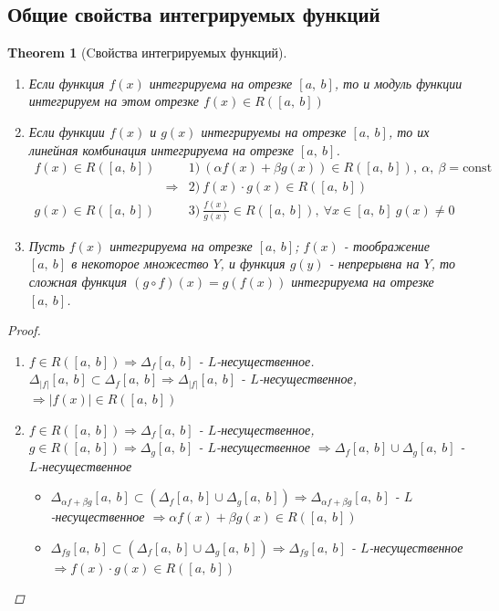 \documentclass[a4paper,12pt, centered]{bookest}
\newtheorem{theorem}{Theorem}[section]
\theoremstyle{remark}
\newcommand\const{\textrm{const}}
\begin{document}
\subsection{Общие свойства интегрируемых функций}
\begin{theorem}[Cвойства интегрируемых функций]$ $ 
	\begin{enumerate}
		\item Если функция $f(x)$ интегрируема на отрезке $[a,\>b]$, то и модуль функции интегрируем на этом отрезке $f(x)\in R([a,\>b])$
		\item Если функции $f(x)$ и $g(x)$   интегрируемы на отрезке $[a,\>b]$, то их линейная комбинация интегрируема на отрезке $[a,\>b]$.\\ $\begin{array}{ccl}
			f(x)\in R([a,\>b]) &&1)\>(\alpha f(x)+\beta g(x))\in R([a,\>b]),\>\alpha,\>\beta =\const\\
			&\Rightarrow&2)\>f(x)\cdot g(x)\in R([a,\>b])\\
			g(x)\in R([a,\>b])&&3)\>\frac{f(x)}{g(x)}\in  R([a,\>b]),\>\forall x\in[a,\>b]\>g(x)\ne0
		\end{array}$
		\item Пусть $f(x)$ интегрируема на отрезке $[a,\>b]$; $f(x)$ - тоображение $[a,\>b]$ в некоторое множество $Y$, и функция $g(y)$ - непрерывна на $Y$, то сложная функция $(g\circ f)(x)=g(f(x))$ интегрируема на отрезке $[a,\>b]$.
	\end{enumerate}
	\begin{proof}$ $ 
		\begin{enumerate}
			\item $f\in R([a,\>b])\Rightarrow\Delta _f[a,\>b]$ - $L$-несущественное. $\Delta_{|f|}[a,\>b]\subset \Delta_ f[a,\>b]\Rightarrow\Delta_{|f|}[a,\>b]$ - $L$-несущественное,$\Rightarrow|f(x)|\in R([a,\>b])$
			\item $f\in R([a,\>b])\Rightarrow \Delta_f[a,\>b]$ - $L$-несущественное, $g\in R([a,\>b])\Rightarrow\Delta_g[a,\>b]$ - $L$-несущественное $\Rightarrow\Delta_f[a,\>b]\cup\Delta_g[a,\>b]$ - $L$-несущественное 
				\begin{itemize}
					\item [1.] $\Delta_{\alpha f+\beta g}[a,\>b]\subset (\Delta_f[a,\>b]\cup\Delta_g[a,\>b])\Rightarrow\Delta_{\alpha f+\beta g}[a,\>b]$ - $L$-несущественное $\Rightarrow\alpha f(x)+\beta g(x)\in R([a,\>b])$
					\item [2.] $\Delta_{fg}[a,\>b]\subset(\Delta_f[a,\>b]\cup\Delta_g[a,\>b])\Rightarrow\Delta_{fg}[a,\>b]$ - $L$-несущественное\\ $\Rightarrow f(x)\cdot g(x)\in R([a,\>b])$

\end{itemize}
\end{enumerate}
\end{proof}
\end{theorem}
\end{document}
